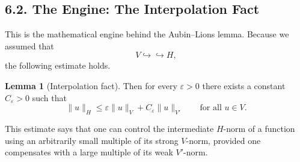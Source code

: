 \documentclass[11pt]{article}
\theoremstyle{definition}
\newtheorem{lemma}{Lemma}
\theoremstyle{remark}
\begin{document}
\subsection*{6.2. The Engine: The Interpolation Fact}
This is the mathematical engine behind the Aubin--Lions lemma. Because we assumed that
\[
  V\hookrightarrow\hookrightarrow H,
\]
the following estimate holds.

\begin{lemma}[Interpolation fact]
Then for every $\varepsilon>0$ there exists a constant $C_\varepsilon>0$ such that
\[
  \|u\|_H
  \le
  \varepsilon\|u\|_V + C_\varepsilon\|u\|_{V'}
  \qquad \text{for all } u\in V.
\]
\end{lemma}

This estimate says that one can control the intermediate $H$-norm of a function using an arbitrarily small multiple of its strong $V$-norm, provided one compensates with a large multiple of its weak $V'$-norm.
\end{document}
